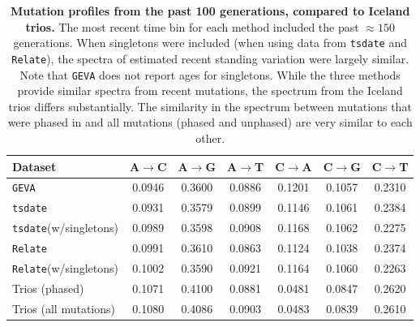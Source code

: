 \documentclass[]{article}
\newcommand{\GEVA}{\texttt{GEVA}\xspace}
\newcommand{\tsdate}{\texttt{tsdate}\xspace}
\newcommand{\relate}{\texttt{Relate}\xspace}
\begin{document}
\begin{table}[h]
    \caption{
        \label{tab:recent-spectra}
        \textbf{Mutation profiles from the past 100 generations,
        compared to Iceland trios.}
        The most recent time bin for each method included the past $\approx150$
        generations. When singletons were included (when using data from
        \tsdate and \relate), the spectra of estimated
        recent standing variation were largely similar. Note that \GEVA
        does not report ages for singletons.
        While the three methods provide similar spectra from recent mutations,
        the spectrum from the Iceland trios differs substantially.
        The similarity in the spectrum between mutations that were phased
        in \citet{jonsson2017parental} and all mutations (phased and unphased)
        are very similar to each other.
    }
    \centering
    \begin{tabular}[t]{l|cccccc}
        \toprule
        Dataset & A$\rightarrow$C & A$\rightarrow$G & A$\rightarrow$T &
            C$\rightarrow$A & C$\rightarrow$G & C$\rightarrow$T \\
        \midrule
        \GEVA & 0.0946 & 0.3600 & 0.0886 & 0.1201 & 0.1057 & 0.2310 \\
        \tsdate & 0.0931 & 0.3579 & 0.0899 & 0.1146 & 0.1061 & 0.2384 \\
        \tsdate (w/singletons) & 0.0989 & 0.3598 & 0.0908 & 0.1168 & 0.1062 & 0.2275 \\
        \relate & 0.0991 & 0.3610 & 0.0863 & 0.1124 & 0.1038 & 0.2374 \\
        \relate (w/singletons) & 0.1002 & 0.3590 & 0.0921 & 0.1164 & 0.1060 & 0.2263 \\
        \midrule
        Trios (phased) & 0.1071 & 0.4100 & 0.0881 & 0.0481 & 0.0847 & 0.2620 \\
        Trios (all mutations) & 0.1080 & 0.4086 & 0.0903 & 0.0483 & 0.0839 & 0.2610 \\
        \bottomrule
    \end{tabular}
\end{table}

\clearpage



\end{document}

